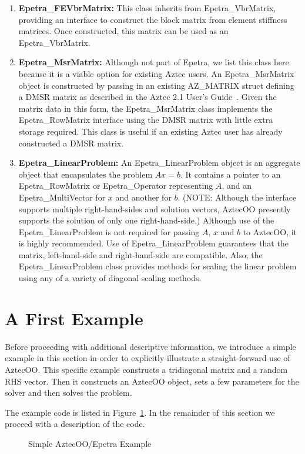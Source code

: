 \documentclass[12pt,relax]{AztecOOUserGuide}
\newcommand{\multivector}{Epetra\_MultiVector}
\newcommand{\vbrmatrix}{Epetra\_VbrMatrix}
\newcommand{\rowmatrix}{Epetra\_RowMatrix}
\newcommand{\linearproblem}{Epetra\_LinearProblem}
\newcommand{\operator}{Epetra\_Operator}
\newcommand{\fevbrmatrix}{Epetra\_FEVbrMatrix}
\newcommand{\msrmatrix}{Epetra\_MsrMatrix}
\begin{document}
\begin{enumerate}
\item{\bf \fevbrmatrix{}:} This class inherits from \vbrmatrix,
providing an interface to construct the block matrix from element stiffness
matrices.  Once constructed, this matrix can be used as an \vbrmatrix{}.
\item{\bf \msrmatrix{}:} Although not part of Epetra, we list this
class here because it is a viable option for existing Aztec users.
An \msrmatrix{} object is constructed by passing in an existing
AZ\_MATRIX struct defining a DMSR matrix as described in the Aztec 2.1
User's Guide~\cite{Aztec2.1}. Given the matrix data in this form, the
\msrmatrix{} class implements the \rowmatrix{} interface using the
DMSR matrix with little extra storage required.  This class is useful
if an existing Aztec user has already constructed a DMSR matrix.
\item{\bf \linearproblem{}:} An \linearproblem{} object is an
aggregate object that encapsulates the problem $Ax=b$.  It contains a
pointer to an \rowmatrix{} or \operator{} representing $A$, and an 
\multivector{} for $x$ and another for $b$.  (NOTE:  Although the
interface supports multiple right-hand-sides and solution vectors,
AztecOO presently supports the solution of only one right-hand-side.)
Although use of the \linearproblem{} is not required for passing $A$,
$x$ and $b$ to AztecOO, it is highly recommended.  Use of
\linearproblem{} guarantees that the matrix, left-hand-side and
right-hand-side are compatible.  Also, the \linearproblem{} class
provides methods for scaling the linear problem using any of a variety
of diagonal scaling methods.
\end{enumerate}




\section{A First Example}
\label{Section:FirstExample}
Before proceeding with additional descriptive information, we
introduce a simple example in this section in order to explicitly
illustrate a straight-forward use of AztecOO.  This specific example
constructs a tridiagonal matrix and a random RHS vector.  Then it
constructs an AztecOO object, sets a few parameters for the solver and
then solves the problem.

The example code is listed in Figure~\ref{Figure:FirstExample}.  
In the remainder of this section we proceed with a
description of the code.
\begin{figure}
\begin{center}

\end{center}
\caption{\label{Figure:FirstExample} Simple AztecOO/Epetra Example}
\end{figure}
\end{document}
